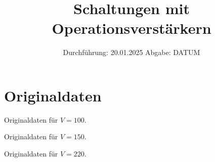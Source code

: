 

\subject{v51}
\title{Schaltungen mit Operationsverstärkern}
\date{%
  Durchführung: 20.01.2025
  \hspace{3em}
  Abgabe: DATUM
}



\maketitle
\thispagestyle{empty}
\tableofcontents
\newpage






\printbibliography{}

\appendix
\section{Originaldaten}
\begin{table}[h]
  \centering
  \caption{Originaldaten für $V=100$.}
  
\end{table}
\begin{table}[h]
  \centering
  \caption{Originaldaten für $V=150$.}
  
\end{table}
\begin{table}[h]
  \centering
  \caption{Originaldaten für $V=220$.}
  
\end{table}



